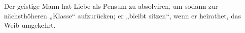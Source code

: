 Der geistige Mann hat Liebe als Pensum zu absolviren, um sodann zur nächsthöheren „Klasse“ aufzurücken; er „bleibt sitzen“, wenn er heirathet, das Weib umgekehrt.
\par

